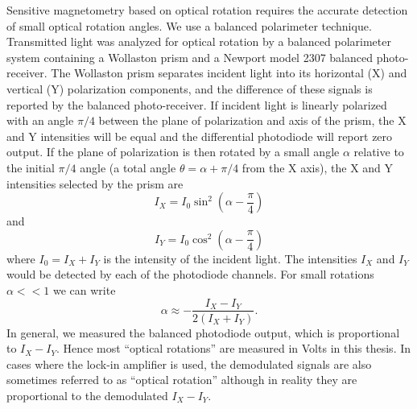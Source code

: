 Sensitive magnetometry based on optical rotation requires the accurate
detection of small optical rotation angles. We use a balanced
polarimeter technique.  Transmitted light was analyzed for optical
rotation by a balanced polarimeter system containing a Wollaston prism
and a Newport model 2307 balanced photo-receiver.
The Wollaston prism separates incident light into its horizontal (X)
and vertical (Y) polarization components, and the difference of these
signals is reported by the balanced photo-receiver.
If incident light is linearly polarized with an angle $\pi/4$ between
the plane of polarization and axis of the prism, the X and Y
intensities will be equal and the differential photodiode will report
zero output.  If the plane of polarization is then rotated by a small
angle $\alpha$ relative to the initial $\pi/4$ angle (a total angle
$\theta=\alpha+\pi/4$ from the X axis), the X and Y intensities
selected by the prism are
\begin{equation}
I_X=I_0\sin^2(\alpha-\frac{\pi}{4})
\end{equation}
and
\begin{equation}
I_Y=I_0\cos^2(\alpha-\frac{\pi}{4})   
\end{equation}
where $I_0=I_X+I_Y$ is the intensity of the incident light.  The
intensities $I_X$ and $I_Y$ would be detected by each of the
photodiode channels.  For small rotations $\alpha<<1$ we can write
\begin{equation}
  \alpha\approx-\frac{I_X-I_Y}{2(I_X+I_Y)}.
\end{equation}
In general, we measured the balanced photodiode output, which is
proportional to $I_X-I_Y$.  Hence most ``optical rotations'' are
measured in Volts in this thesis.  In cases where the lock-in
amplifier is used, the demodulated signals are also sometimes referred
to as ``optical rotation'' although in reality they are proportional
to the demodulated $I_X-I_Y$.
